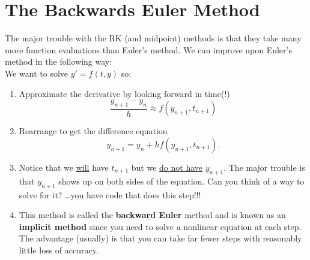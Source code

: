 \newpage\section{The Backwards Euler Method}
\begin{problem}
    The major trouble with the RK (and midpoint) methods is that they take many more
    function evaluations than Euler's method.  We can improve upon Euler's method in the
    following way:\\
    We want to solve $y' = f(t,y)$ so:
    \begin{enumerate}
        \item Approximate the derivative by looking forward in time(!)
            \[ \frac{y_{n+1} - y_n}{h} \approx f(y_{n+1}, t_{n+1}) \]
        \item Rearrange to get the difference equation
            \[ y_{n+1} = y_n + h f(y_{n+1},t_{n+1}). \]
        \item Notice that we \underline{will} have $t_{n+1}$ but we \underline{do not
            have} $y_{n+1}$.  The major trouble is that $y_{n+1}$ shows up on both sides
            of the equation.  Can you think of a way to solve for it? \dots you have code
            that does this step!!!
        \item This method is called the {\bf backward Euler} method and is known as an
            {\bf implicit method} since you need to solve a nonlinear equation at each
            step.  The advantage (usually) is that you can take far fewer steps with
            reasonably little loss of accuracy.
    \end{enumerate}
\end{problem}

